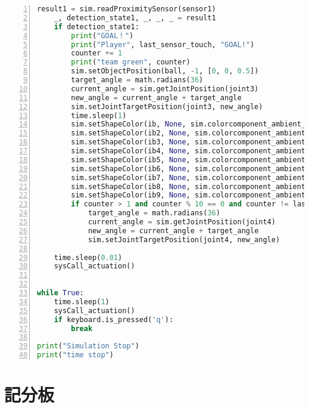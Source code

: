 \begin{lstlisting}[language=Python, frame=single, numbers=left, captionpos=b, basicstyle=\ttfamily\small, showstringspaces=false, breaklines=true, tabsize=4, xleftmargin=15pt]
    result1 = sim.readProximitySensor(sensor1)
    _, detection_state1, _, _, _ = result1
    if detection_state1:
        print("GOAL！")
        print("Player", last_sensor_touch, "GOAL!")
        counter += 1
        print("team green", counter)
        sim.setObjectPosition(ball, -1, [0, 0, 0.5])
        target_angle = math.radians(36)
        current_angle = sim.getJointPosition(joint3)
        new_angle = current_angle + target_angle
        sim.setJointTargetPosition(joint3, new_angle)
        time.sleep(1)
        sim.setShapeColor(ib, None, sim.colorcomponent_ambient_diffuse, [0, 0, 1])
        sim.setShapeColor(ib2, None, sim.colorcomponent_ambient_diffuse, [0, 0, 1])
        sim.setShapeColor(ib3, None, sim.colorcomponent_ambient_diffuse, [1, 1, 1])
        sim.setShapeColor(ib4, None, sim.colorcomponent_ambient_diffuse, [1, 1, 1])
        sim.setShapeColor(ib5, None, sim.colorcomponent_ambient_diffuse, [1, 1, 1])
        sim.setShapeColor(ib6, None, sim.colorcomponent_ambient_diffuse, [0, 0, 0])
        sim.setShapeColor(ib7, None, sim.colorcomponent_ambient_diffuse, [1, 1, 1])
        sim.setShapeColor(ib8, None, sim.colorcomponent_ambient_diffuse, [1, 1, 1])
        sim.setShapeColor(ib9, None, sim.colorcomponent_ambient_diffuse, [1, 1, 1])
        if counter > 1 and counter % 10 == 0 and counter != last_executed_multiple + 1:
            target_angle = math.radians(36)
            current_angle = sim.getJointPosition(joint4)
            new_angle = current_angle + target_angle
            sim.setJointTargetPosition(joint4, new_angle)
 
    time.sleep(0.01)
    sysCall_actuation()
 
 
while True:
    time.sleep(1)
    sysCall_actuation()
    if keyboard.is_pressed('q'):
        break
 
print("Simulation Stop")
print("time stop")
\end{lstlisting}

\newpage
\section{記分板}

